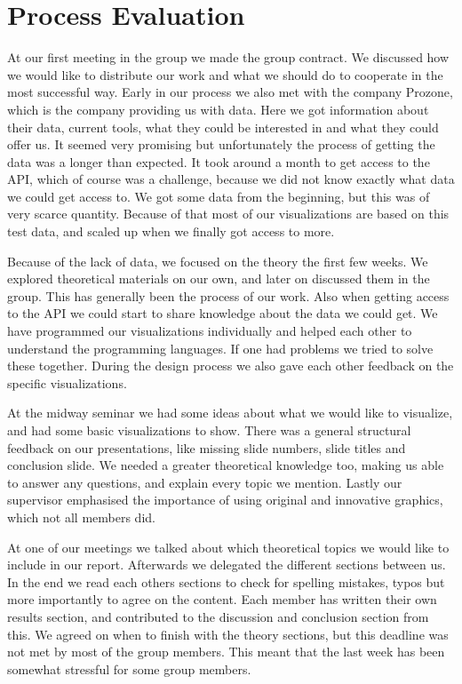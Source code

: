 \documentclass[Report.tex]{subfiles}
\begin{document}
\section*{Process Evaluation}
\pagestyle{empty}
At our first meeting in the group we made the group contract. We discussed how we would like to distribute our work and what we should do to cooperate in the most successful way. Early in our process we also met with the company Prozone, which is the company providing us with data. Here we got information about their data, current tools, what they could be interested in and what they could offer us. It seemed very promising but unfortunately the process of getting the data was a longer than expected. It took around a month to get access to the API, which of course was a challenge, because we did not know exactly what data we could get access to. We got some data from the beginning, but this was of very scarce quantity. Because of that most of our visualizations are based on this test data, and scaled up when we finally got access to more.

Because of the lack of data, we focused on the theory the first few weeks. We explored  theoretical materials on our own, and later on discussed them in the group. This has generally been the process of our work. Also when getting access to the API we could start to share knowledge about the data we could get. We have programmed our visualizations individually and helped each other to understand the programming languages. If one had problems we tried to solve these together. During the design process we also gave each other feedback on the specific visualizations. 

At the midway seminar we had some ideas about what we would like to visualize, and had some basic visualizations to show. There was a general structural feedback on our presentations, like missing slide numbers, slide titles and conclusion slide. We needed a greater theoretical knowledge too, making us able to answer any questions, and explain every topic we mention. Lastly our supervisor emphasised the importance of using original and innovative graphics, which not all members did.

At one of our meetings we talked about which theoretical topics we would like to include in our report. Afterwards we delegated the different sections between us.  In the end we read each others sections to check for spelling mistakes, typos but more importantly to agree on the content. Each member has written their own results section, and contributed to the discussion and conclusion section from this. We agreed on when to  finish with the theory sections, but this deadline was not met by most of the group members. This meant that the last week has been somewhat stressful for some group members.
\end{document}

